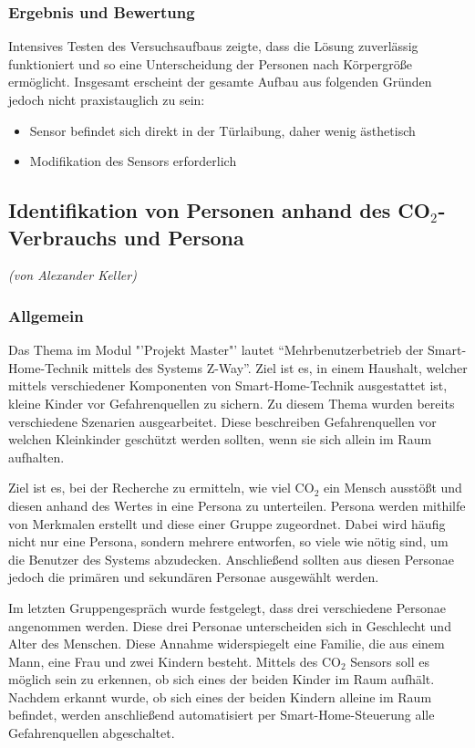 \subsubsection{Ergebnis und Bewertung}
Intensives Testen des Versuchsaufbaus zeigte, dass die Lösung zuverlässig funktioniert und so eine Unterscheidung der Personen nach Körpergröße ermöglicht. Insgesamt erscheint der gesamte Aufbau aus folgenden Gründen jedoch nicht praxistauglich zu sein:
\begin{itemize}
	\item Sensor befindet sich direkt in der Türlaibung, daher wenig ästhetisch
	\item Modifikation des Sensors erforderlich
\end{itemize}

\subsection{Identifikation von Personen anhand des CO$_2$-Verbrauchs und Persona}
\label{subsec:identifkationPersona}
\emph{(von Alexander Keller)}

\subsubsection{Allgemein}
Das Thema im Modul "'Projekt Master"' lautet "`Mehrbenutzerbetrieb der Smart-Home-Technik mittels des Systems Z-Way"'. Ziel ist es, in einem Haushalt, welcher mittels verschiedener Komponenten von Smart-Home-Technik ausgestattet ist, kleine Kinder vor Gefahrenquellen zu sichern. Zu diesem Thema wurden bereits verschiedene Szenarien ausgearbeitet. Diese beschreiben Gefahrenquellen vor welchen Kleinkinder geschützt werden sollten, wenn sie sich allein im Raum aufhalten.

Ziel ist es, bei der Recherche zu ermitteln, wie viel CO$_2$ ein Mensch ausstößt und diesen anhand des Wertes in eine Persona zu unterteilen. Persona werden mithilfe von Merkmalen erstellt und diese einer Gruppe zugeordnet. Dabei wird häufig nicht nur eine Persona, sondern mehrere entworfen, so viele wie nötig sind, um die Benutzer des Systems abzudecken. Anschließend sollten aus diesen Personae jedoch die primären und sekundären Personae ausgewählt werden.

Im letzten Gruppengespräch wurde festgelegt, dass drei verschiedene Personae angenommen werden. Diese drei Personae unterscheiden sich in Geschlecht und Alter des Menschen. Diese Annahme widerspiegelt eine Familie, die aus einem Mann, eine Frau und zwei Kindern besteht. Mittels des CO$_2$ Sensors soll es möglich sein zu erkennen, ob sich eines der beiden Kinder im Raum aufhält. Nachdem erkannt wurde, ob sich eines der beiden Kindern alleine im Raum befindet, werden anschließend automatisiert per Smart-Home-Steuerung alle Gefahrenquellen abgeschaltet.

